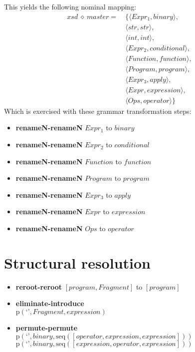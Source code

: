 This yields the following nominal mapping:
\begin{align*}\mathit{xsd} \:\diamond\: \mathit{master} =\:& \{\langle \mathit{Expr_1},\mathit{binary}\rangle,\\
 & \langle str,str\rangle,\\
 & \langle int,int\rangle,\\
 & \langle \mathit{Expr_2},\mathit{conditional}\rangle,\\
 & \langle \mathit{Function},\mathit{function}\rangle,\\
 & \langle \mathit{Program},\mathit{program}\rangle,\\
 & \langle \mathit{Expr_3},\mathit{apply}\rangle,\\
 & \langle \mathit{Expr},\mathit{expression}\rangle,\\
 & \langle \mathit{Ops},\mathit{operator}\rangle\}\end{align*}
 Which is exercised with these grammar transformation steps:

{\footnotesize\begin{itemize}
\item \textbf{renameN-renameN} $\mathit{Expr_1}$ to $\mathit{binary}$
\item \textbf{renameN-renameN} $\mathit{Expr_2}$ to $\mathit{conditional}$
\item \textbf{renameN-renameN} $\mathit{Function}$ to $\mathit{function}$
\item \textbf{renameN-renameN} $\mathit{Program}$ to $\mathit{program}$
\item \textbf{renameN-renameN} $\mathit{Expr_3}$ to $\mathit{apply}$
\item \textbf{renameN-renameN} $\mathit{Expr}$ to $\mathit{expression}$
\item \textbf{renameN-renameN} $\mathit{Ops}$ to $\mathit{operator}$
\end{itemize}}

\section{Structural resolution}
{\footnotesize\begin{itemize}
\item \textbf{reroot-reroot} $\left[\mathit{program}, \mathit{Fragment}\right]$ to $\left[\mathit{program}\right]$
\item \textbf{eliminate-introduce}\\$\mathrm{p}\left(\text{`'},\mathit{Fragment},\mathit{expression}\right)$
\item \textbf{permute-permute}\\$\mathrm{p}\left(\text{`'},\mathit{binary},\mathrm{seq}\left(\left[\mathit{operator}, \mathit{expression}, \mathit{expression}\right]\right)\right)$\\$\mathrm{p}\left(\text{`'},\mathit{binary},\mathrm{seq}\left(\left[\mathit{expression}, \mathit{operator}, \mathit{expression}\right]\right)\right)$
\end{itemize}}
